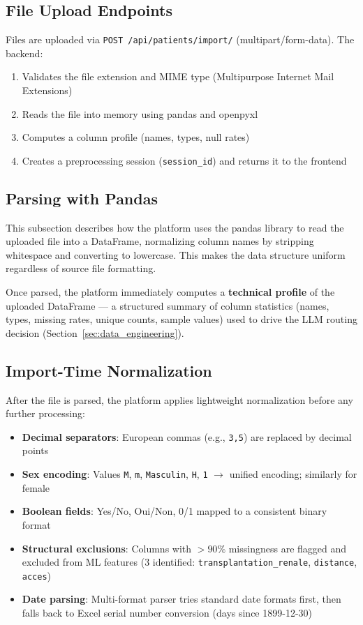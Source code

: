 \documentclass[12pt,a4paper,twoside]{report}
\begin{document}
\subsection{File Upload Endpoints}

Files are uploaded via \texttt{POST /api/patients/import/} (multipart/form-data). The backend:
\begin{enumerate}
  \item Validates the file extension and MIME type (Multipurpose Internet Mail Extensions)
  \item Reads the file into memory using pandas and openpyxl
  \item Computes a column profile (names, types, null rates)
  \item Creates a preprocessing session (\texttt{session\_id}) and returns it to the frontend
\end{enumerate}

\subsection{Parsing with Pandas}

This subsection describes how the platform uses the pandas library to read the uploaded file into a DataFrame, normalizing column names by stripping whitespace and converting to lowercase. This makes the data structure uniform regardless of source file formatting.

Once parsed, the platform immediately computes a \textbf{technical profile} of the uploaded DataFrame — a structured summary of column statistics (names, types, missing rates, unique counts, sample values) used to drive the LLM routing decision (Section~\ref{sec:data_engineering}).

\subsection{Import-Time Normalization}\label{sec:cleaning}

After the file is parsed, the platform applies lightweight normalization before any further processing:

\begin{itemize}
  \item \textbf{Decimal separators}: European commas (e.g., \texttt{3,5}) are replaced by decimal points
  \item \textbf{Sex encoding}: Values \texttt{M}, \texttt{m}, \texttt{Masculin}, \texttt{H}, \texttt{1} $\rightarrow$ unified encoding; similarly for female
  \item \textbf{Boolean fields}: Yes/No, Oui/Non, 0/1 mapped to a consistent binary format
  \item \textbf{Structural exclusions}: Columns with $>90\%$ missingness are flagged and excluded from ML features (3 identified: \texttt{transplantation\_renale}, \texttt{distance}, \texttt{acces})
  \item \textbf{Date parsing}: Multi-format parser tries standard date formats first, then falls back to Excel serial number conversion (days since 1899-12-30)
\end{itemize}
\end{document}
